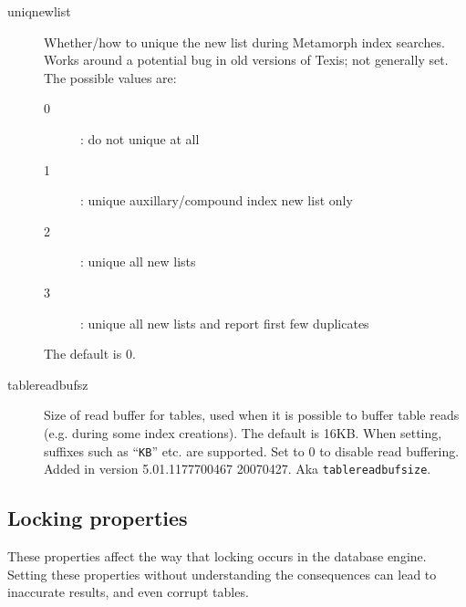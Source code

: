 \begin{description}
\item[uniqnewlist] Whether/how to unique the new list during
Metamorph index searches.  Works around a potential bug in old
versions of Texis; not generally set.  The possible values are:
\begin{description}
  \item[0]:  do not unique at all
  \item[1]:  unique auxillary/compound index new list only
  \item[2]:  unique all new lists
  \item[3]:  unique all new lists and report first few duplicates
\end{description}
The default is 0.

\item[tablereadbufsz] Size of read buffer for tables, used when it is
possible to buffer table reads (e.g. during some index creations).  The
default is 16KB.  When setting, suffixes such as ``\verb`KB`'' etc.
are supported.  Set to 0 to disable read buffering.  Added in version
5.01.1177700467 20070427.  Aka \verb`tablereadbufsize`.

\end{description}

\subsection{Locking properties}

These properties affect the way that locking occurs in the database engine.
Setting these properties without understanding the consequences can lead
to inaccurate results, and even corrupt tables.

